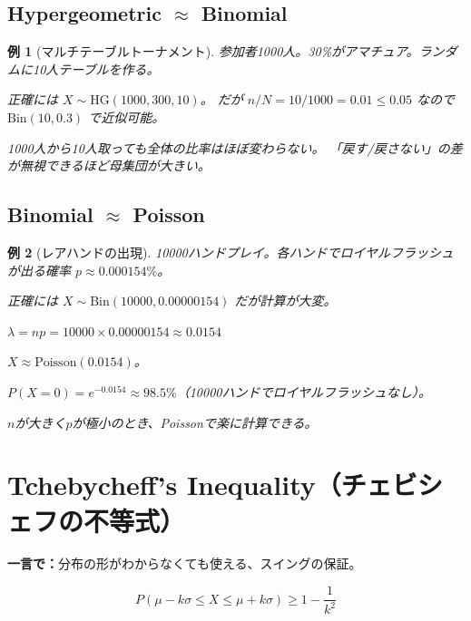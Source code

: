 \documentclass{article}
\newtheorem{example}{例}[section]
\theoremstyle{remark}
\begin{document}
\subsection{Hypergeometric $\approx$ Binomial}

\begin{example}[マルチテーブルトーナメント]
  参加者1000人。30\%がアマチュア。ランダムに10人テーブルを作る。

  正確には $X \sim \text{HG}(1000, 300, 10)$。
  だが $n/N = 10/1000 = 0.01 \le 0.05$ なので
  $\text{Bin}(10, 0.3)$ で近似可能。

  1000人から10人取っても全体の比率はほぼ変わらない。
  「戻す/戻さない」の差が無視できるほど母集団が大きい。
\end{example}

\subsection{Binomial $\approx$ Poisson}

\begin{example}[レアハンドの出現]
  10000ハンドプレイ。各ハンドでロイヤルフラッシュが出る確率 $p \approx 0.000154\%$。

  正確には $X \sim \text{Bin}(10000, 0.00000154)$ だが計算が大変。

  $\lambda = np = 10000 \times 0.00000154 \approx 0.0154$

  $X \approx \text{Poisson}(0.0154)$。

  $P(X = 0) = e^{-0.0154} \approx 98.5\%$（10000ハンドでロイヤルフラッシュなし）。

  $n$が大きく$p$が極小のとき、Poissonで楽に計算できる。
\end{example}

\section{Tchebycheff's Inequality（チェビシェフの不等式）}

\textbf{一言で：}分布の形がわからなくても使える、スイングの保証。

\[
  P(\mu - k\sigma \le X \le \mu + k\sigma) \ge 1 - \frac{1}{k^2}
\]
\end{document}

